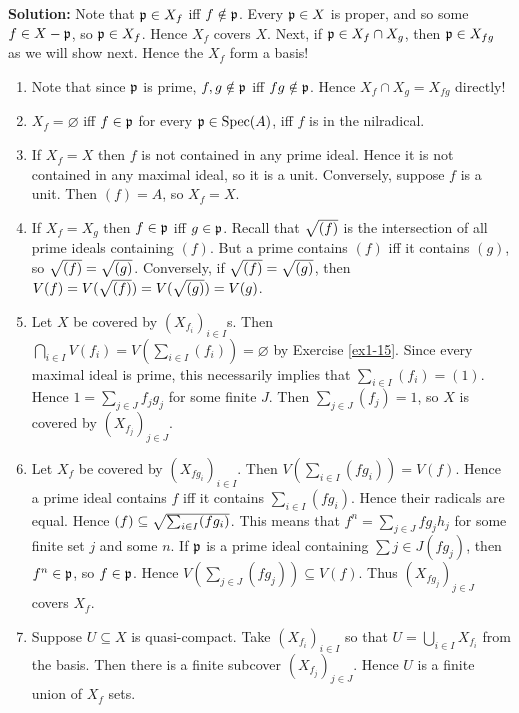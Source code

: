 \documentclass{article}
\begin{document}
\noindent\textbf{Solution:}
Note that \(\mathfrak{p} \in X_f\) iff \(f \notin \mathfrak{p}\).
Every \(\mathfrak{p} \in X\) is proper, and so some \(f \in X - \mathfrak{p}\), so \(\mathfrak{p} \in X_f\).
Hence \(X_f\) covers \(X\).
Next, if \(\mathfrak{p} \in X_f \cap X_g\), then \(\mathfrak{p} \in X_{fg}\) as we will show next.
Hence the \(X_f\) form a basis!
\begin{enumerate}
    \item
        Note that since \(\mathfrak{p}\) is prime, \(f, g \notin \mathfrak{p}\) iff \(fg \notin \mathfrak{p}\).
        Hence \(X_f \cap X_g = X_{fg}\) directly!
    \item
        \(X_f = \varnothing\) iff \(f \in \mathfrak{p}\) for every \(\mathfrak{p} \in \operatorname{Spec}(A)\), iff \(f\) is in the nilradical.
    \item
        If \(X_f = X\) then \(f\) is not contained in any prime ideal.
        Hence it is not contained in any maximal ideal, so it is a unit.
        Conversely, suppose \(f\) is a unit.
        Then \((f) = A\), so \(X_f = X\).
    \item
        If \(X_f = X_g\) then \(f \in \mathfrak{p}\) iff \(g \in \mathfrak{p}\).
        Recall that \(\sqrt{(f)}\) is the intersection of all prime ideals containing \((f)\).
        But a prime contains \((f)\) iff it contains \((g)\), so \(\sqrt{(f)} = \sqrt{(g)}\).
        Conversely, if \(\sqrt{(f)} = \sqrt{(g)}\), then \(V(f) = V(\sqrt{(f)}) = V(\sqrt{(g)}) = V(g)\).
    \item
        Let \(X\) be covered by \((X_{f_i})_{i \in I}\)s.
        Then \(\bigcap_{i \in I} V(f_i) = V(\sum_{i \in I} (f_i)) = \varnothing\) by Exercise \ref{ex1-15}.
        Since every maximal ideal is prime, this necessarily implies that \(\sum_{i \in I} (f_i) = (1)\).
        Hence \(1 = \sum_{j \in J} f_j g_j\) for some finite \(J\).
        Then \(\sum_{j \in J} (f_j) = 1\), so \(X\) is covered by \((X_{f_j})_{j \in J}\).
    \item
        Let \(X_f\) be covered by \((X_{fg_i})_{i \in I}\).
        Then \(V(\sum_{i \in I} (f g_i)) = V(f)\).
        Hence a prime ideal contains \(f\) iff it contains \(\sum_{i \in I} (f g_i)\).
        Hence their radicals are equal.
        Hence \((f) \subseteq \sqrt{\sum_{i \in I} (f g_i)}\).
        This means that \(f^n = \sum_{j \in J} f g_j h_j\) for some finite set \(j\) and some \(n\).
        If \(\mathfrak{p}\) is a prime ideal containing \(\sum{j \in J} (f g_j)\), then \(f^n \in \mathfrak{p}\), so \(f \in \mathfrak{p}\).
        Hence \(V(\sum_{j \in J} (f g_j)) \subseteq V(f)\).
        Thus \((X_{f g_j})_{j \in J}\) covers \(X_f\).
    \item
        Suppose \(U \subseteq X\) is quasi-compact.
        Take \((X_{f_i})_{i \in I}\) so that \(U = \bigcup_{i \in I} X_{f_i}\) from the basis.
        Then there is a finite subcover \((X_{f_j})_{j \in J}\).
        Hence \(U\) is a finite union of \(X_f\) sets.


\end{enumerate}
\end{document}
